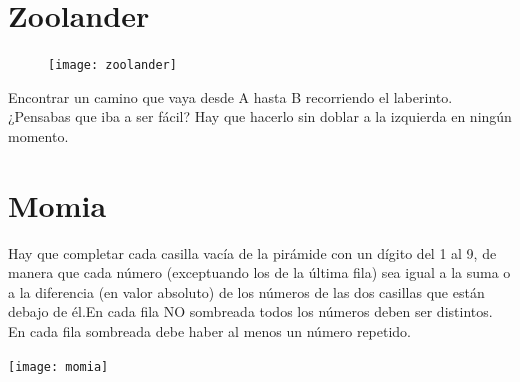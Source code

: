 \documentclass[12pt, a4paper]{article}
\begin{document}
\section*{Zoolander}
\begin{figure}
\vspace{-2.3em}
\texttt{[image: zoolander]}
\end{figure}

Encontrar un camino que vaya desde A hasta B recorriendo el laberinto.
¿Pensabas que iba a ser fácil? Hay que hacerlo sin doblar a la izquierda
en ningún momento.


\section*{Momia}

Hay que completar cada casilla vacía de la pirámide con un dígito del 1 al 9,
de manera que cada número (exceptuando los de la última fila) sea igual a la suma
o a la diferencia (en valor absoluto) de los números de las dos casillas que
están debajo de él.En cada fila NO sombreada todos los números deben ser distintos.
En cada fila sombreada debe haber al menos un número repetido.

\begin{centering}
\texttt{[image: momia]}
\end{centering}

\end{document}

